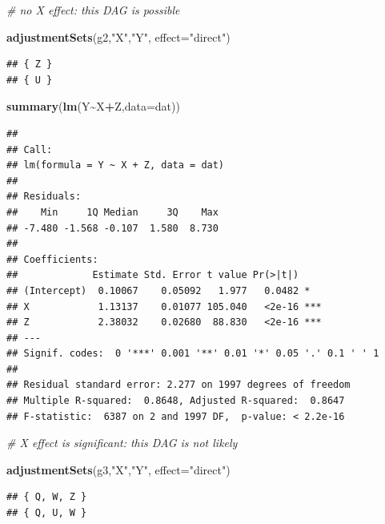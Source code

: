 \documentclass[
]{book}
\newenvironment{Shaded}{\begin{snugshade}}{\end{snugshade}}
\newcommand{\AttributeTok}[1]{\textcolor[rgb]{0.13,0.29,0.53}{#1}}
\newcommand{\CommentTok}[1]{\textcolor[rgb]{0.56,0.35,0.01}{\textit{#1}}}
\newcommand{\FunctionTok}[1]{\textcolor[rgb]{0.13,0.29,0.53}{\textbf{#1}}}
\newcommand{\NormalTok}[1]{#1}
\newcommand{\SpecialCharTok}[1]{\textcolor[rgb]{0.81,0.36,0.00}{\textbf{#1}}}
\newcommand{\StringTok}[1]{\textcolor[rgb]{0.31,0.60,0.02}{#1}}
\begin{document}
\begin{Shaded}
\begin{Highlighting}[]
\CommentTok{\# no X effect: this DAG is possible}

\FunctionTok{adjustmentSets}\NormalTok{(g2,}\StringTok{"X"}\NormalTok{,}\StringTok{"Y"}\NormalTok{, }\AttributeTok{effect=}\StringTok{"direct"}\NormalTok{)}
\end{Highlighting}
\end{Shaded}

\begin{verbatim}
## { Z }
## { U }
\end{verbatim}

\begin{Shaded}
\begin{Highlighting}[]
\FunctionTok{summary}\NormalTok{(}\FunctionTok{lm}\NormalTok{(Y}\SpecialCharTok{\textasciitilde{}}\NormalTok{X}\SpecialCharTok{+}\NormalTok{Z,}\AttributeTok{data=}\NormalTok{dat))}
\end{Highlighting}
\end{Shaded}

\begin{verbatim}
## 
## Call:
## lm(formula = Y ~ X + Z, data = dat)
## 
## Residuals:
##    Min     1Q Median     3Q    Max 
## -7.480 -1.568 -0.107  1.580  8.730 
## 
## Coefficients:
##             Estimate Std. Error t value Pr(>|t|)    
## (Intercept)  0.10067    0.05092   1.977   0.0482 *  
## X            1.13137    0.01077 105.040   <2e-16 ***
## Z            2.38032    0.02680  88.830   <2e-16 ***
## ---
## Signif. codes:  0 '***' 0.001 '**' 0.01 '*' 0.05 '.' 0.1 ' ' 1
## 
## Residual standard error: 2.277 on 1997 degrees of freedom
## Multiple R-squared:  0.8648, Adjusted R-squared:  0.8647 
## F-statistic:  6387 on 2 and 1997 DF,  p-value: < 2.2e-16
\end{verbatim}

\begin{Shaded}
\begin{Highlighting}[]
\CommentTok{\# X effect is significant: this DAG is not likely}

\FunctionTok{adjustmentSets}\NormalTok{(g3,}\StringTok{"X"}\NormalTok{,}\StringTok{"Y"}\NormalTok{, }\AttributeTok{effect=}\StringTok{"direct"}\NormalTok{)}
\end{Highlighting}
\end{Shaded}

\begin{verbatim}
## { Q, W, Z }
## { Q, U, W }
\end{verbatim}
\end{document}
